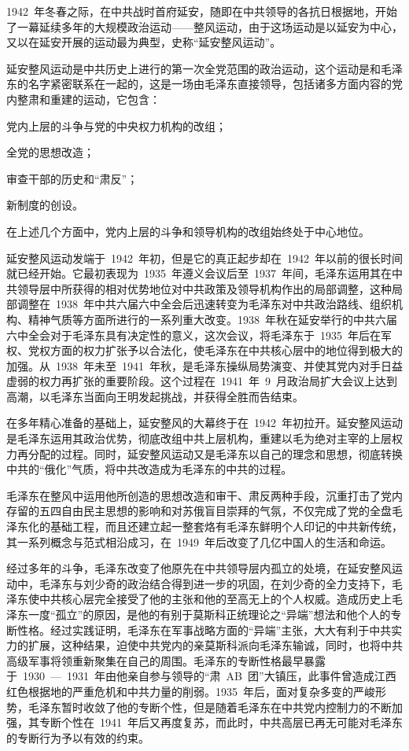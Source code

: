 
\begin{pre-post-text}
1942~年冬春之际，在中共战时首府延安，随即在中共领导的各抗日根据地，开始了一幕延续多年的大规模政治运动——整风运动，由于这场运动是以延安为中心，又以在延安开展的运动最为典型，史称“延安整风运动”。

延安整风运动是中共历史上进行的第一次全党范围的政治运动，这个运动是和毛泽东的名字紧密联系在一起的，这是一场由毛泽东直接领导，包括诸多方面内容的党内整肃和重建的运动，它包含：

党内上层的斗争与党的中央权力机构的改组；

全党的思想改造；

审查干部的历史和“肃反”；

新制度的创设。

在上述几个方面中，党内上层的斗争和领导机构的改组始终处于中心地位。

延安整风运动发端于~1942~年初，但是它的真正起步却在~1942~年以前的很长时间就已经开始。它最初表现为~1935~年遵义会议后至~1937~年间，毛泽东运用其在中共领导层中所获得的相对优势地位对中共政策及领导机构作出的局部调整，这种局部调整在~1938~年中共六届六中全会后迅速转变为毛泽东对中共政治路线、组织机构、精神气质等方面所进行的一系列重大改变。1938~年秋在延安举行的中共六届六中全会对于毛泽东具有决定性的意义，这次会议，将毛泽东于~1935~年后在军权、党权方面的权力扩张予以合法化，使毛泽东在中共核心层中的地位得到极大的加强。从~1938~年未至~1941~年秋，是毛泽东操纵局势演变、并使其党内对手日益虚弱的权力再扩张的重要阶段。这个过程在~1941~年~9~月政治局扩大会议上达到高潮，以毛泽东当面向王明发起挑战，并获得全胜而告结束。

在多年精心准备的基础上，延安整风的大幕终于在~1942~年初拉开。延安整风运动是毛泽东运用其政治优势，彻底改组中共上层机构，重建以毛为绝对主宰的上层权力再分配的过程。同时，延安整风运动又是毛泽东以自己的理念和思想，彻底转换中共的“俄化”气质，将中共改造成为毛泽东的中共的过程。

毛泽东在整风中运用他所创造的思想改造和审干、肃反两种手段，沉重打击了党内存留的五四自由民主思想的影响和对苏俄盲目崇拜的气氛，不仅完成了党的全盘毛泽东化的基础工程，而且还建立起一整套烙有毛泽东鲜明个人印记的中共新传统，其一系列概念与范式相沿成习，在~1949~年后改变了几亿中国人的生活和命运。

经过多年的斗争，毛泽东改变了他原先在中共领导层内孤立的处境，在延安整风运动中，毛泽东与刘少奇的政治结合得到进一步的巩固，在刘少奇的全力支持下，毛泽东使中共核心层完全接受了他的主张和他的至高无上的个人权威。造成历史上毛泽东一度“孤立”的原因，是他的有别于莫斯科正统理论之“异端”想法和他个人的专断性格。经过实践证明，毛泽东在军事战略方面的“异端”主张，大大有利于中共实力的扩展，这种结果，迫使中共党内的亲莫斯科派向毛泽东输诚，同时，也将中共高级军事将领重新聚集在自己的周围。毛泽东的专断性格最早暴露于~1930~—~1931~年由他亲自参与领导的“肃~AB~团”大镇压，此事件曾造成江西红色根据地的严重危机和中共力量的削弱。1935~年后，面对复杂多变的严峻形势，毛泽东暂时收敛了他的专断个性，但是随着毛泽东在中共党内控制力的不断加强，其专断个性在~1941~年后又再度复苏，而此时，中共高层已再无可能对毛泽东的专断行为予以有效的约束。


\end{pre-post-text}
